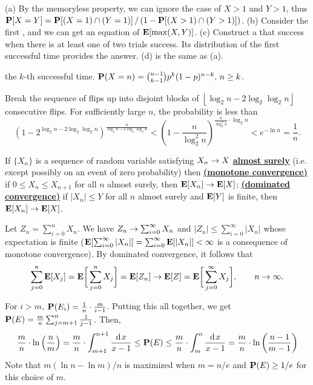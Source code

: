 \documentclass[main.tex]{subfiles}
\begin{document}
\bigskip

 (a) By the memoryless property, we can ignore the case of $X > 1$ and $Y >1$, thus $\mathbf{P}[X=Y]=\mathbf{P}[(X=1)\cap(Y=1)]\,/\,(1-\mathbf{P}[(X>1)\cap(Y>1)])$. (b) Consider the first , and we can get an equation of $\mathbf{E}[\max(X,Y)]$. (c) Construct a  that success when there is at least one of two trials success. Its distribution of the first successful time provides the answer. (d) is the same as (a).

  the $k$-th successful time. $\mathbf{P}(X=n)=\binom{n-1}{k-1}p^k(1-p)^{n-k},\,n\ge k$.

 Break the sequence of flips up into disjoint blocks of $\left\lfloor \log_2 n - 2\log_2\log_2 n\right\rfloor$ consecutive flips. For sufficiently large $n$, the probability is less than
\[
	\left(1-2^{\log_2n-2\log_2\log_2n}\right)^\frac{n}{\log_2n-2\log_2\log_2n}<\left(1-\frac{n}{\log_2^2n}\right)^{\frac{n}{\log_2^2 n}\cdot\log_2 n} < e^{-\ln n} = \frac{1}{n}.
\]

 If $\{X_n\}$ is a sequence of random variable satisfying $X_n\rightarrow X$ \href{https://en.wikipedia.org/wiki/Almost_surely}{\bf almost surely} (i.e. except possibly on an event of zero probability) then \href{https://en.wikipedia.org/wiki/Monotone_convergence_theorem}{\bf (monotone convergence)} if $0\le X_n\le X_{n+1}$ for all $n$ almost surely, then $\mathbf{E}[X_n]\rightarrow\mathbf{E}[X]$; \href{https://en.wikipedia.org/wiki/Dominated_convergence_theorem}{\bf (dominated convergence)} if $\lvert X_n\rvert \le Y$ for all $n$ almost surely and $\mathbf{E}[Y]$ is finite, then $\mathbf{E}[X_n]\rightarrow\mathbf{E}[X]$. 

Let $Z_n=\sum_{i=0}^{n}X_n$. We have $Z_n \rightarrow \sum_{i=0}^{\infty} X_n$ and $\lvert Z_n \rvert \le \sum_{i=0}^{\infty} \lvert X_n \rvert$ whose expectation is finite ($\mathbf{E}[\sum_{i=0}^{\infty}|X_n|]=\sum_{i=0}^{\infty}\mathbf{E}[|X_n|]<\infty$ is a consequence of monotone convergence). By dominated convergence, it follows that
\[
	\sum_{j=0}^{n}\mathbf{E}[X_j]=\mathbf{E}\biggl[\,\sum_{j=0}^{n}X_j\biggr]=\mathbf{E}[Z_n] \rightarrow \mathbf{E}[Z] = \mathbf{E}\biggl[\,\sum_{j=0}^{\infty}X_j\biggr],\qquad n \rightarrow \infty.
\]

 For $i > m$, $\mathbf{P}(E_i)=\frac{1}{n}\cdot\frac{m}{i-1}$. Putting this all together, we get $\mathbf{P}(E)=\frac{m}{n}\sum_{j=m+1}^{n} \frac{1}{j-1}$. Then,
\[
	\frac{m}{n}\cdot \ln\left(\frac{n}{m}\right)=\frac{m}{n}\cdot\int_{m+1}^{n+1}\frac{\mathrm{d}\;\! x}{x-1}\le \mathbf{P}(E)\le \frac{m}{n}\cdot\int_{m}^{n}\frac{\mathrm{d}\;\! x}{x-1}=\frac{m}{n}\cdot\ln\left(\frac{n-1}{m-1}\right)
\]
Note that $m(\ln n-\ln m)/n$ is maximized when $m=n/e$ and $\mathbf{P}(E) \ge 1/e$ for this choice of $m$.
\end{document}
